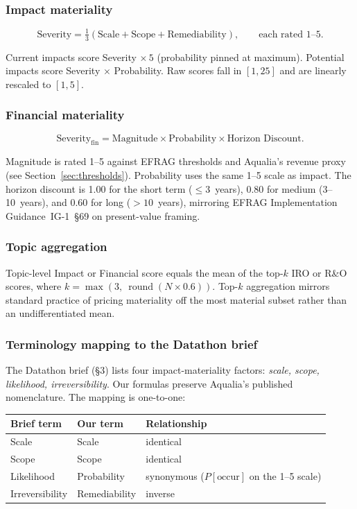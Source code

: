 \documentclass[11pt, a4paper, twoside, openright]{scrreprt}
\begin{document}
\subsubsection{Impact materiality}

\[
\text{Severity} = \tfrac{1}{3}\left(\text{Scale} + \text{Scope} + \text{Remediability}\right), \qquad \text{each rated } 1\text{--}5.
\]

Current impacts score Severity $\times\,5$ (probability pinned at maximum). Potential impacts score Severity $\times$ Probability. Raw scores fall in $[1, 25]$ and are linearly rescaled to $[1, 5]$.

\subsubsection{Financial materiality}

\[
\text{Severity}_{\text{fin}} = \text{Magnitude} \times \text{Probability} \times \text{Horizon Discount}.
\]

Magnitude is rated 1--5 against EFRAG thresholds and Aqualia's revenue proxy (see Section~\ref{sec:thresholds}). Probability uses the same 1--5 scale as impact. The horizon discount is 1.00 for the short term ($\leq 3$~years), 0.80 for medium (3--10~years), and 0.60 for long ($>10$~years), mirroring EFRAG Implementation Guidance~IG-1~\S69 on present-value framing.

\subsubsection{Topic aggregation}

Topic-level Impact or Financial score equals the mean of the top-$k$ IRO or R\&O scores, where $k = \max(3,\ \operatorname{round}(N \times 0.6))$. Top-$k$ aggregation mirrors standard practice of pricing materiality off the most material subset rather than an undifferentiated mean.

\subsubsection{Terminology mapping to the Datathon brief}

The Datathon brief (\S 3) lists four impact-materiality factors: \emph{scale, scope, likelihood, irreversibility}. Our formulas preserve Aqualia's published nomenclature. The mapping is one-to-one:

\begin{center}
\small
\begin{tabular}{@{}l l p{6.5cm}@{}}
\toprule
\textbf{Brief term} & \textbf{Our term} & \textbf{Relationship} \\
\midrule
Scale & Scale & identical \\
Scope & Scope & identical \\
Likelihood & Probability & synonymous ($P[\text{occur}]$ on the 1--5 scale) \\
Irreversibility & Remediability & inverse \\
\bottomrule
\end{tabular}
\end{center}
\end{document}
